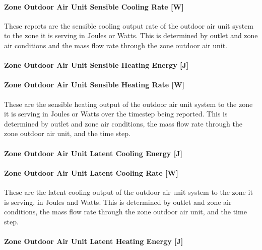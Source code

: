 \paragraph{Zone Outdoor Air Unit Sensible Cooling Rate {[}W{]}}\label{zone-outdoor-air-unit-sensible-cooling-rate-w}

These reports are the sensible cooling output rate of the outdoor air unit system to the zone it is serving in Joules or Watts. This is determined by outlet and zone air conditions and the mass flow rate through the zone outdoor air unit.

\paragraph{Zone Outdoor Air Unit Sensible Heating Energy {[}J{]}}\label{zone-outdoor-air-unit-sensible-heating-energy-j}

\paragraph{Zone Outdoor Air Unit Sensible Heating Rate {[}W{]}}\label{zone-outdoor-air-unit-sensible-heating-rate-w}

These are the sensible heating output of the outdoor air unit system to the zone it is serving in Joules or Watts over the timestep being reported. This is determined by outlet and zone air conditions, the mass flow rate through the zone outdoor air unit, and the time step.

\paragraph{Zone Outdoor Air Unit Latent Cooling Energy {[}J{]}}\label{zone-outdoor-air-unit-latent-cooling-energy-j}

\paragraph{Zone Outdoor Air Unit Latent Cooling Rate {[}W{]}}\label{zone-outdoor-air-unit-latent-cooling-rate-w}

These are the latent cooling output of the outdoor air unit system to the zone it is serving, in Joules and Watts. This is determined by outlet and zone air conditions, the mass flow rate through the zone outdoor air unit, and the time step.

\paragraph{Zone Outdoor Air Unit Latent Heating Energy {[}J{]}}\label{zone-outdoor-air-unit-latent-heating-energy-j}

